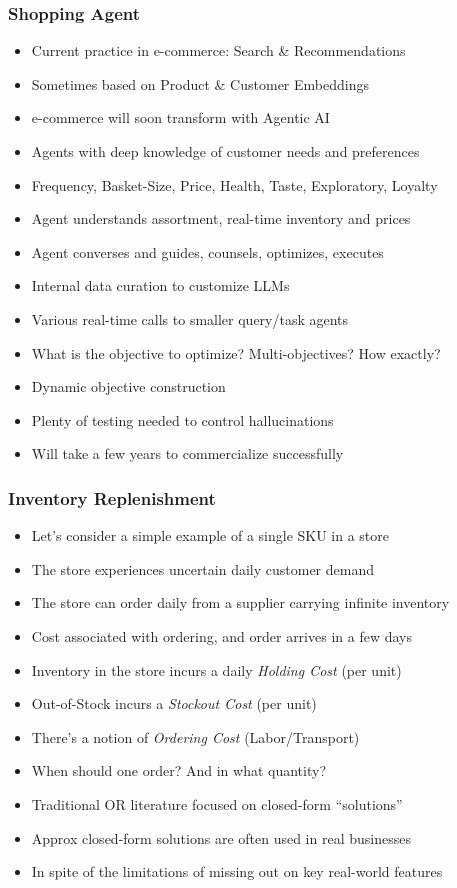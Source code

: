 \documentclass[handout]{beamer}
\begin{document}
\begin{frame}
\frametitle{Shopping Agent}
\pause
\begin{itemize}[<+->]
\item Current practice in e-commerce: Search \& Recommendations
\item Sometimes based on Product \& Customer Embeddings
\item e-commerce will soon transform with Agentic AI
\item Agents with deep knowledge of customer needs and preferences
\item Frequency, Basket-Size, Price, Health, Taste, Exploratory, Loyalty
\item Agent understands assortment, real-time inventory and prices
\item Agent converses and guides, counsels, optimizes, executes
\item Internal data curation to customize LLMs
\item Various real-time calls to smaller query/task agents
\item What is the objective to optimize? Multi-objectives? How exactly?
\item Dynamic objective construction
\item Plenty of testing needed to control hallucinations
\item Will take a few years to commercialize successfully
\end{itemize}
\end{frame}

\begin{frame}
\frametitle{Inventory Replenishment}
\pause
\begin{itemize}[<+->]
\item Let's consider a simple example of a single SKU in a store
\item The store experiences uncertain daily customer demand
\item The store can order daily from a supplier carrying infinite inventory
\item Cost associated with ordering, and order arrives in a few days
\item Inventory in the store incurs a daily {\em Holding Cost} (per unit)
\item Out-of-Stock incurs a {\em Stockout Cost} (per unit)
\item There's a notion of {\em Ordering Cost} (Labor/Transport)
\item When should one order? And in what quantity?
\item Traditional OR literature focused on closed-form ``solutions''
\item Approx closed-form solutions are often used in real businesses
\item In spite of the limitations of missing out on key real-world features
\end{itemize}
\end{frame}
\end{document}
